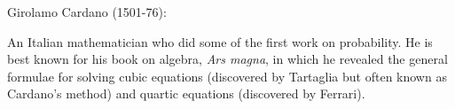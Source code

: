 Girolamo Cardano (1501-76):
\par
An Italian mathematician who did some of the first work on probability. He is best known for his book on algebra, \emph{Ars magna}, in which he revealed the general formulae for solving cubic equations (discovered by Tartaglia but often known as Cardano's method) and quartic equations (discovered by Ferrari).
  
  
  